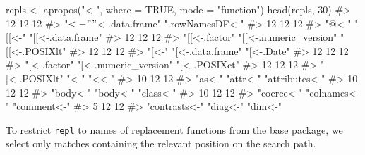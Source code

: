 \documentclass[
]{krantz}
\makeatletter
\newenvironment{Shaded}{\begin{snugshade}}{\end{snugshade}}
\newcommand{\CommentTok}[1]{\textcolor[rgb]{0.56,0.35,0.01}{\textit{#1}}}
\newcommand{\DataTypeTok}[1]{\textcolor[rgb]{0.13,0.29,0.53}{#1}}
\newcommand{\DecValTok}[1]{\textcolor[rgb]{0.00,0.00,0.81}{#1}}
\newcommand{\KeywordTok}[1]{\textcolor[rgb]{0.13,0.29,0.53}{\textbf{#1}}}
\newcommand{\NormalTok}[1]{#1}
\newcommand{\OtherTok}[1]{\textcolor[rgb]{0.56,0.35,0.01}{#1}}
\newcommand{\StringTok}[1]{\textcolor[rgb]{0.31,0.60,0.02}{#1}}
\newenvironment{kframe}{%
\medskip{}
\setlength{\fboxsep}{.8em}
 \def\at@end@of@kframe{}%
 \ifinner\ifhmode%
  \def\at@end@of@kframe{\end{minipage}}%
  \begin{minipage}{\columnwidth}%
 \fi\fi%
 \def\FrameCommand##1{\hskip\@totalleftmargin \hskip-\fboxsep
 \colorbox{shadecolor}{##1}\hskip-\fboxsep
     \hskip-\linewidth \hskip-\@totalleftmargin \hskip\columnwidth}%
 \MakeFramed {\advance\hsize-\width
   \@totalleftmargin\z@ \linewidth\hsize
   \@setminipage}}%
 {\par\unskip\endMakeFramed%
 \at@end@of@kframe}
\renewenvironment{Shaded}{\begin{kframe}}{\end{kframe}}
\renewcommand{\KeywordTok} [1]{\textcolor[rgb]{0.00,0.44,0.13}{{#1}}}
\renewcommand{\DataTypeTok}[1]{\textcolor[rgb]{0.56,0.13,0.00}{{#1}}}
\renewcommand{\DecValTok}  [1]{\textcolor[rgb]{0.25,0.63,0.44}{{#1}}}
\renewcommand{\StringTok}  [1]{\textcolor[rgb]{0.25,0.44,0.63}{{#1}}}
\renewcommand{\CommentTok} [1]{\textcolor[rgb]{0.38,0.63,0.69}{{#1}}}
\renewcommand{\OtherTok}   [1]{\textcolor[rgb]{0.00,0.44,0.13}{{#1}}}
\renewcommand{\NormalTok}  [1]{{#1}}
\makeatother
\begin{document}
\begin{Shaded}
\begin{Highlighting}[]
\NormalTok{repls <-}\StringTok{ }\KeywordTok{apropos}\NormalTok{(}\StringTok{"<-"}\NormalTok{, }\DataTypeTok{where =} \OtherTok{TRUE}\NormalTok{, }\DataTypeTok{mode =} \StringTok{"function"}\NormalTok{)}
\KeywordTok{head}\NormalTok{(repls, }\DecValTok{30}\NormalTok{)}
\CommentTok{#>                     12                     12                     12 }
\CommentTok{#>                  "$<-"       "$<-.data.frame"        ".rowNamesDF<-" }
\CommentTok{#>                     12                     12                     12 }
\CommentTok{#>                  "@<-"                 "[[<-"      "[[<-.data.frame" }
\CommentTok{#>                     12                     12                     12 }
\CommentTok{#>          "[[<-.factor" "[[<-.numeric_version"         "[[<-.POSIXlt" }
\CommentTok{#>                     12                     12                     12 }
\CommentTok{#>                  "[<-"       "[<-.data.frame"             "[<-.Date" }
\CommentTok{#>                     12                     12                     12 }
\CommentTok{#>           "[<-.factor"  "[<-.numeric_version"          "[<-.POSIXct" }
\CommentTok{#>                     12                     12                     12 }
\CommentTok{#>          "[<-.POSIXlt"                   "<-"                  "<<-" }
\CommentTok{#>                     10                     12                     12 }
\CommentTok{#>                 "as<-"               "attr<-"         "attributes<-" }
\CommentTok{#>                     10                     12                     12 }
\CommentTok{#>               "body<-"               "body<-"              "class<-" }
\CommentTok{#>                     10                     12                     12 }
\CommentTok{#>             "coerce<-"           "colnames<-"            "comment<-" }
\CommentTok{#>                      5                     12                     12 }
\CommentTok{#>          "contrasts<-"               "diag<-"                "dim<-"}
\end{Highlighting}
\end{Shaded}

To restrict \texttt{repl} to names of replacement functions from the base package, we select only matches containing the relevant position on the search path.
\end{document}
